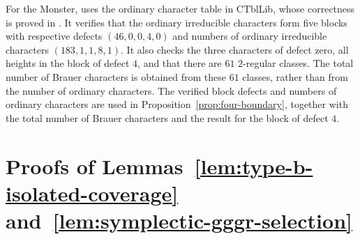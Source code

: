 \documentclass[10pt]{amsart}
\theoremstyle{definition}
\numberwithin{equation}{section}
\numberwithin{table}{section}
\begin{document}
For the Monster,  uses the ordinary
character table in CTblLib, whose correctness is proved in
\cite[Section~5]{BreuerMagaardWilsonMonster2026}.  It verifies that the
ordinary irreducible characters form five blocks with respective defects
$(46,0,0,4,0)$ and numbers of ordinary irreducible characters
$(183,1,1,8,1)$.
It also checks the three characters of defect zero, all heights in the block
of defect $4$, and that there are $61$ $2$-regular classes.  The total number
of Brauer characters is obtained from these $61$ classes, rather than from the
number of ordinary characters.  The verified block defects and numbers of
ordinary characters
are used in Proposition~\ref{prop:four-boundary}, together with the total
number of Brauer characters and the result for the block of defect $4$.


\section{Proofs of Lemmas~\ref{lem:type-b-isolated-coverage} and~\ref{lem:symplectic-gggr-selection}}
\label{app:gggr-proofs}
\end{document}
